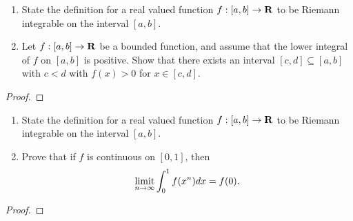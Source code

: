 \documentclass[11pt,twoside,openany]{memoir}
\begin{document}
\newpage
\fancyhead[L]{\scalebox{0.9}{Integration}}
\fancyhead[R]{\scalebox{0.9}{Appeared on: S21}}
\begin{problem}
    \phantom{a}
    \begin{enumerate}[label = (\arabic*)]
        \item State the definition for a real valued function $f:[a,b] \rightarrow \mathbf{R}$ to be Riemann integrable on the interval $[a,b]$.
        \item Let $f:[a,b] \rightarrow \mathbf{R}$ be a bounded function, and assume that the lower integral of $f$ on $[a,b]$ is positive. Show that there exists an interval $[c,d] \subseteq [a,b]$ with $c<d$ with $f(x) > 0$ for $x \in [c,d]$.
    \end{enumerate}
\end{problem}
\begin{proof}
\end{proof}

\newpage
\fancyhead[L]{\scalebox{0.9}{Integration}}
\fancyhead[R]{\scalebox{0.9}{Appeared on: W21}}
\begin{problem}
    \phantom{a}
    \begin{enumerate}[label = (\arabic*)]
        \item State the definition for a real valued function $f:[a,b] \rightarrow \mathbf{R}$ to be Riemann integrable on the interval $[a,b]$.
        \item Prove that if $f$ is continuous on $[0,1]$, then
            \begin{equation*}
            \begin{split}
                \operatorname*{limit}_{n \rightarrow \infty} \int_0^1 f(x^n)dx = f(0).
            \end{split}
            \end{equation*}
    \end{enumerate}
\end{problem}
\begin{proof}
\end{proof}
\end{document}
